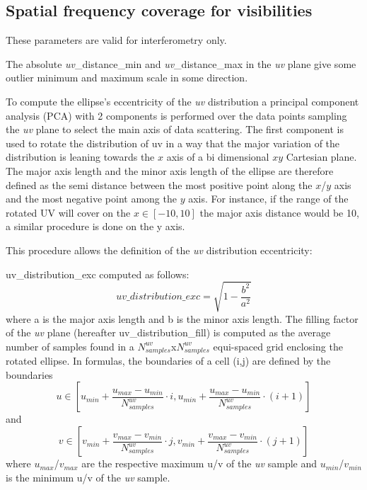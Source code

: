 \documentclass[11pt,a4paper]{ivoa}
\begin{document}
\subsection{Spatial frequency coverage for visibilities  }
These parameters are valid for interferometry only.

The absolute \emph{uv}\_distance\_min and \emph{uv}\_distance\_max  in the \emph{uv} plane give some outlier minimum and maximum scale in some direction.

To compute the ellipse's eccentricity of the \emph{uv} distribution a principal component analysis
(PCA) with 2 components is performed over the data points sampling the \emph{uv} plane to select the
main axis of data scattering. 
The first component is used to rotate the distribution of uv in a way that the major variation
of the distribution is leaning towards the $x$ axis of a bi dimensional $xy$ Cartesian plane.
The major axis length and the minor axis length of the ellipse are therefore defined as the
semi distance between the most positive point along the $x$/$y$ axis and the most negative point
among the $y$ axis. For instance, if the range of the rotated UV will cover on the $x \in [-10,
10]$ the major axis distance would be 10, a similar procedure is done on the y axis.

This procedure allows the definition of the \emph{uv} distribution eccentricity:

uv\_distribution\_exc computed as follows:
\begin{equation}
uv\_distribution\_exc = \sqrt{1-\frac{b^2}{a^2}}
\end{equation}
where a is the major axis length and b is the minor axis length.
The filling factor of the \emph{uv} plane (hereafter uv\_distribution\_fill) is computed as the average
number of samples found in a $N^{uv}_{samples}$x$N^{uv}_{samples}$ equi-spaced grid enclosing the
rotated ellipse. In formulas, the boundaries of a cell (i,j) are defined by the boundaries
\begin{equation}
u \in [u_{min} + \frac{u_{max} - u_{min}}{N^{uv}_{samples}} \cdot i , u_{min} + \frac{u_{max} -
u_{min}}{N^{uv}_{samples}} \cdot (i + 1)]
\end{equation}
and
\begin{equation}
v \in [v_{min} + \frac{v_{max} - v_{min}}{N^{uv}_{samples}} \cdot j , v_{min} + \frac{v_{max} -
v_{min}}{N^{uv}_{samples}} \cdot (j + 1)]
\end{equation}
where $u_{max}$/$v_{max}$ are the respective maximum u/v of the \emph{uv} sample and
$u_{min}$/$v_{min}$ is the minimum u/v of the \emph{uv} sample.
\end{document}
